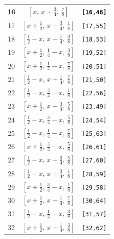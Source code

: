 \documentclass[fleqn,8pt]{jsarticle}
\begin{document}
\begin{longtable}{ccc}
16 & $\left[ x,\, x + \frac{3}{4},\, \frac{7}{8} \right]$ & {\tt [16,46]} \\ \hline
17 & $\left[ x + \frac{1}{2},\, x + \frac{3}{4},\, \frac{1}{8} \right]$ & {\tt [17,55]} \\ \hline
18 & $\left[ \frac{1}{2} - x,\, x + \frac{1}{4},\, \frac{3}{8} \right]$ & {\tt [18,53]} \\ \hline
19 & $\left[ x + \frac{1}{2},\, \frac{1}{4} - x,\, \frac{3}{8} \right]$ & {\tt [19,52]} \\ \hline
20 & $\left[ x + \frac{1}{2},\, \frac{1}{4} - x,\, \frac{7}{8} \right]$ & {\tt [20,51]} \\ \hline
21 & $\left[ \frac{1}{2} - x,\, x + \frac{1}{4},\, \frac{7}{8} \right]$ & {\tt [21,50]} \\ \hline
22 & $\left[ \frac{1}{2} - x,\, \frac{3}{4} - x,\, \frac{1}{8} \right]$ & {\tt [22,56]} \\ \hline
23 & $\left[ x + \frac{1}{2},\, x + \frac{3}{4},\, \frac{5}{8} \right]$ & {\tt [23,49]} \\ \hline
24 & $\left[ \frac{1}{2} - x,\, \frac{3}{4} - x,\, \frac{5}{8} \right]$ & {\tt [24,54]} \\ \hline
25 & $\left[ \frac{1}{2} - x,\, \frac{1}{4} - x,\, \frac{7}{8} \right]$ & {\tt [25,63]} \\ \hline
26 & $\left[ x + \frac{1}{2},\, \frac{3}{4} - x,\, \frac{5}{8} \right]$ & {\tt [26,61]} \\ \hline
27 & $\left[ \frac{1}{2} - x,\, x + \frac{3}{4},\, \frac{5}{8} \right]$ & {\tt [27,60]} \\ \hline
28 & $\left[ \frac{1}{2} - x,\, x + \frac{3}{4},\, \frac{1}{8} \right]$ & {\tt [28,59]} \\ \hline
29 & $\left[ x + \frac{1}{2},\, \frac{3}{4} - x,\, \frac{1}{8} \right]$ & {\tt [29,58]} \\ \hline
30 & $\left[ x + \frac{1}{2},\, x + \frac{1}{4},\, \frac{7}{8} \right]$ & {\tt [30,64]} \\ \hline
31 & $\left[ \frac{1}{2} - x,\, \frac{1}{4} - x,\, \frac{3}{8} \right]$ & {\tt [31,57]} \\ \hline
32 & $\left[ x + \frac{1}{2},\, x + \frac{1}{4},\, \frac{3}{8} \right]$ & {\tt [32,62]} \\
\end{longtable}
\renewcommand{\arraystretch}{1.2}
\end{document}
